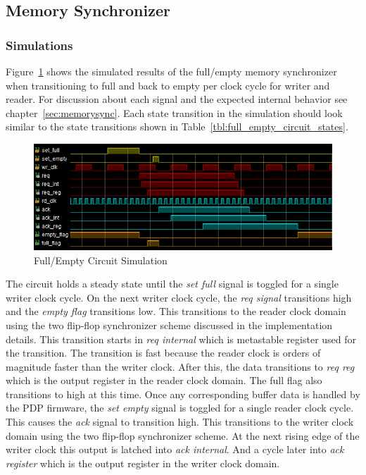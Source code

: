 
\label{chap:experimental_results}


\subsection{Memory Synchronizer}

\subsubsection{Simulations}
Figure~\ref{fig:full_empty_sim} shows the simulated results of the full/empty memory synchronizer when transitioning to full and back to empty per clock cycle for writer and reader. For discussion about each signal and the expected internal behavior see chapter~\ref{sec:memorysync}. Each state transition in the simulation should look similar to the state transitions shown in Table~\ref{tbl:full_empty_circuit_states}.

\begin{figure}
    \centering
    \includegraphics[width=1.0\textwidth]{fig/full_empty_sim.png}
    \caption{Full/Empty Circuit Simulation}
    \label{fig:full_empty_sim}
\end{figure}

The circuit holds a steady state until the {\it set full} signal is toggled for a single writer clock cycle. On the next writer clock cycle, the {\it req signal} transitions high and the {\it empty flag} transitions low. This transitions to the reader clock domain using the two flip-flop synchronizer scheme discussed in the implementation details. This transition starts in {\it req internal} which is metastable register used for the transition. The transition is fast because the reader clock is orders of magnitude faster than the writer clock. After this, the data transitions to {\it req reg} which is the output register in the reader clock domain. The full flag also transitions to high at this time. Once any corresponding buffer data is handled by the PDP firmware, the {\it set empty} signal is toggled for a single reader clock cycle. This causes the {\it ack} signal to transition high. This transitions to the writer clock domain using the two flip-flop synchronizer scheme. At the next rising edge of the writer clock this output is latched into {\it ack internal}. And a cycle later into {\it ack register} which is the output register in the writer clock domain.

